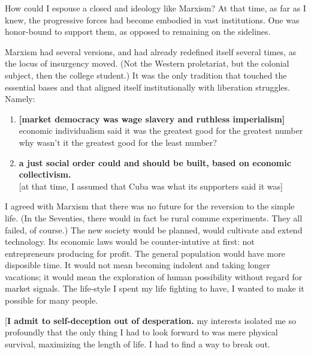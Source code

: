 How could I espouse a closed and \asidenote{[doctrinaire]} ideology like Marxism?  At that time, as far as I knew, the progressive forces had become embodied in vast institutions.  One was honor-bound to support them, as opposed to remaining on the sidelines. 

Marxism had several versions, and had already redefined itself several times, as the locus of insurgency moved.  (Not the Western proletariat, but the colonial subject, then the college student.)  It was the only tradition that touched the essential bases and that aligned itself institutionally with liberation struggles.  Namely:
\begin{enumerate}[label=\roman*)]
\item \textbf{[market democracy was wage slavery and ruthless imperialism]} \\
economic individualism said it was the greatest good for the greatest number \\
why wasn't it the greatest good for the least number?
\item \textbf{a just social order could and should be built, based on economic collectivism.} \\{}
[at that time, I assumed that Cuba was what its supporters said it was] \\
\end{enumerate}
I agreed with Marxism that there was no future for the reversion to the simple life.  (In the Seventies, there would in fact be rural comune experiments.  They all failed, of course.)  The new society would be planned, would cultivate and extend technology.  Its economic laws would be counter-intutive at first:  not entrepreneurs producing for profit.  The general population would have more disposible time.  It would not mean becoming indolent and taking longer vacations; it would mean the exploration of human possibility without regard for market signals.  The life-style I spent my life fighting to have, I wanted to make it possible for many people.

[\textbf{I admit to self-deception out of desperation.}  my interests isolated me so profoundly that the only thing I had to look forward to was mere physical survival, maximizing the length of life.  I had to find a way to break out.

\Pb

